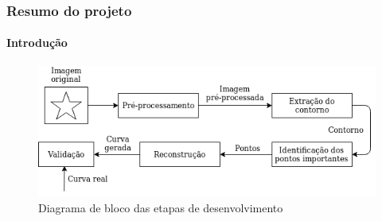 \begin{frame}
\frametitle{Resumo do projeto}
\framesubtitle{Introdução}

\begin{figure}[hbt]
	\begin{center}
		\caption{Diagrama de bloco das etapas de desenvolvimento}
		\includegraphics[width=1\textwidth]{img/diagrama.png}
	\end{center}
\end{figure}

\end{frame}


